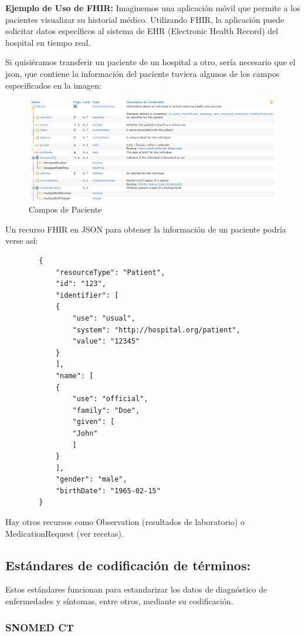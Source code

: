 \documentclass[12pt, a4paper, twoside]{article}
\begin{document}
	\textbf{Ejemplo de Uso de FHIR:} Imaginemos una aplicación móvil que permite a los pacientes visualizar su historial médico. Utilizando FHIR, la aplicación puede solicitar datos específicos al sistema de EHR (Electronic Health Record) del hospital en tiempo real.
	
	Si quisiéramos transferir un paciente de un hospital a otro, sería necesario que el json, que contiene la información del paciente tuviera algunos de los campos especificados en la imagen:
	
	\begin{figure}[h!]
		\includegraphics[width=1\textwidth]{image/2.png}
		\caption{Campos de Paciente}
		\label{fig:2}
	\end{figure}
	
	
	Un recurso FHIR en JSON para obtener la información de un paciente podría verse así:
	
	\begin{verbatim}
		{
			"resourceType": "Patient",
			"id": "123",
			"identifier": [
			{
				"use": "usual",
				"system": "http://hospital.org/patient",
				"value": "12345"
			}
			],
			"name": [
			{
				"use": "official",
				"family": "Doe",
				"given": [
				"John"
				]
			}
			],
			"gender": "male",
			"birthDate": "1965-02-15"
		}
	\end{verbatim}
	
	Hay otros recursos como Observation (resultados de laboratorio) o MedicationRequest (ver recetas).
	
	\subsection{Estándares de codificación de términos:}
	
	Estos estándares funcionan para estandarizar los datos de diagnóstico de enfermedades y síntomas, entre otros, mediante su codificación.
	
	\subsubsection{SNOMED CT}
	
\end{document}
